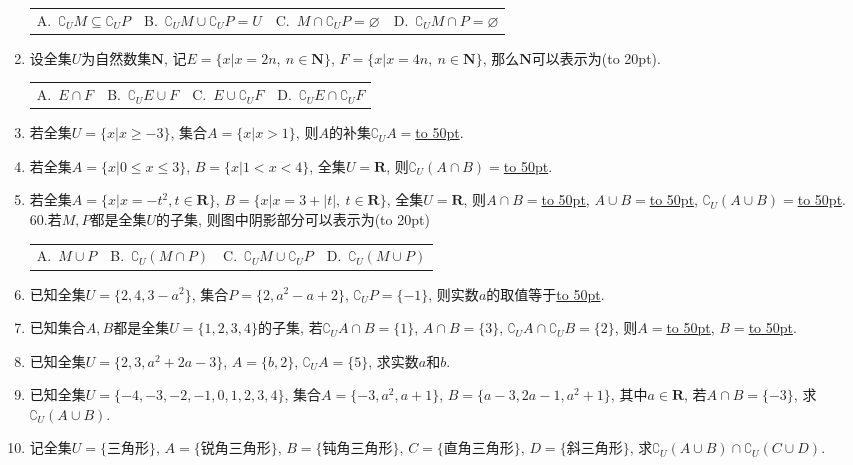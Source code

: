 \documentclass[10pt,a4paper]{article}
\newcommand{\blank}[1]{\underline{\hbox to #1pt{}}}
\newcommand{\bracket}[1]{(\hbox to #1pt{})}
\newcommand{\fourch}[4]{\par\begin{tabular}{p{.23\textwidth}p{.23\textwidth}p{.23\textwidth}p{.23\textwidth}}
A.~#1 &B.~#2& C.~#3& D.~#4
\end{tabular}}
\begin{document}
\begin{enumerate}[1.]
\fourch{$\complement_UM\subseteq \complement_UP$}{$\complement_UM\cup \complement_UP=U$}{$M\cap \complement_UP=\varnothing$}{$\complement_UM\cap P=\varnothing$}
\item 设全集$U$为自然数集$\mathbf{N}$, 记$E=\{x|x=2n,\ n\in \mathbf{N}\}$, $F=\{x|x=4n,\ n\in \mathbf{N}\}$, 那么$\mathbf{N}$可以表示为\bracket{20}.
\fourch{$E\cap F$}{$\complement_UE\cup F$}{$E\cup \complement_UF$}{$\complement_UE\cap \complement_UF$}
\item 若全集$U=\{x|x\ge -3\}$, 集合$A=\{x|x>1\}$, 则$A$的补集$\complement_UA=$\blank{50}.
\item 若全集$A=\{x|0\le x\le 3\}$, $B=\{x|1<x<4\}$, 全集$U=\mathbf{R}$, 则$\complement_U(A\cap B)=$\blank{50}.
\item 若全集$A=\{x|x=-t^2,t\in \mathbf{R}\}$, $B=\{x|x=3+|t|, \ t\in \mathbf{R}\}$, 全集$U=\mathbf{R}$, 则$A\cap B=$\blank{50}, $A\cup B=$\blank{50}, $\complement_U(A\cup B)=$\blank{50}.
60.若$M,P$都是全集$U$的子集, 则图中阴影部分可以表示为\bracket{20}
\fourch{$M\cup P$}{$\complement_U(M\cap P)$}{$\complement_UM\cup \complement_UP$}{$\complement_U(M\cup P)$}
\begin{center}
\end{center}
\item 已知全集$U=\{2,4,3-a^2\}$, 集合$P=\{2,a^2-a+2\}$, $\complement_UP=\{-1\}$, 则实数$a$的取值等于\blank{50}.
\item 已知集合$A,B$都是全集$U=\{1,2,3,4\}$的子集, 若$\complement_UA\cap B=\{1\}$, $A\cap B=\{3\}$, $\complement_UA\cap \complement_UB=\{2\}$, 则$A=$\blank{50}, $B=$\blank{50}.
\item 已知全集$U=\{2,3,a^2+2a-3\}$, $A=\{b,2\}$, $\complement_UA=\{5\}$, 求实数$a$和$b$.
\item 已知全集$U=\{-4,-3,-2,-1,0,1,2,3,4\}$, 集合$A=\{-3,a^2,a+1\}$, $B=\{a-3,2a-1,a^2+1\}$, 其中$a\in \mathbf{R}$, 若$A\cap B=\{-3\}$, 求$\complement_U(A\cup B)$.
\item 记全集$U=\{\text{三角形}\}$, $A=\{\text{锐角三角形}\}$, $B=\{\text{钝角三角形}\}$, $C=\{\text{直角三角形}\}$, $D=\{\text{斜三角形}\}$, 求$\complement_U(A\cup B)\cap \complement_U(C\cup D)$.

\end{enumerate}
\end{document}
